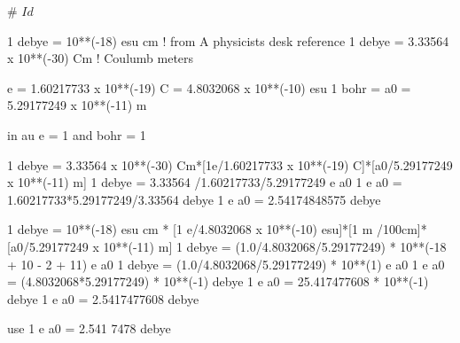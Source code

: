 # $Id$

1 debye = 10**(-18) esu cm      ! from A physicists desk reference
1 debye = 3.33564 x  10**(-30) Cm  ! Coulumb meters



e = 1.60217733 x 10**(-19) C = 4.8032068 x 10**(-10) esu
1 bohr = a0 = 5.29177249 x 10**(-11) m

in au e = 1 and bohr = 1


1 debye = 3.33564 x 10**(-30) Cm*[1e/1.60217733 x 10**(-19) C]*[a0/5.29177249 x 10**(-11) m]
1 debye = 3.33564 /1.60217733/5.29177249 e a0
1 e a0 = 1.60217733*5.29177249/3.33564 debye
1 e a0 = 2.54174848575 debye


1 debye = 10**(-18) esu cm * [1 e/4.8032068 x 10**(-10) esu]*[1 m /100cm]*[a0/5.29177249 x 10**(-11) m]
1 debye = (1.0/4.8032068/5.29177249) * 10**(-18 + 10 - 2 + 11) e a0
1 debye = (1.0/4.8032068/5.29177249) * 10**(1) e a0
1 e a0  = (4.8032068*5.29177249) * 10**(-1) debye
1 e a0  = 25.417477608 * 10**(-1) debye
1 e a0  = 2.5417477608 debye

use 1 e a0 = 2.541 7478 debye
